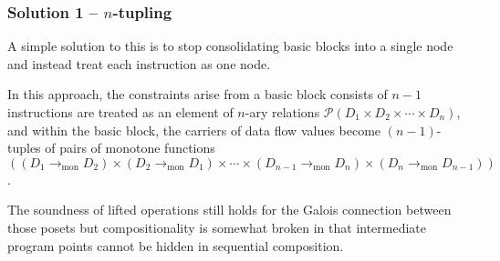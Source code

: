 \documentclass{beamer}
\newcommand{\Pow}{\mathcal{P}}
\newcommand{\tomon}{\to_{\mathrm{mon}}}
\begin{document}
\begin{frame}
  \frametitle{Solution 1 -- $n$-tupling}
  A simple solution to this is to stop consolidating basic blocks into a single node and instead treat each instruction as one node.

  In this approach, the constraints arise from a basic block consists of $n-1$ instructions are treated as an element of $n$-ary relations $\Pow(D_{1} \times D_{2} \times  \cdots  \times D_{n})$, and within the basic block, the carriers of data flow values become $(n-1)$-tuples of pairs of monotone functions $((D_{1} \tomon D_{2}) \times (D_{2} \tomon D_{1}) \times \cdots \times (D_{n-1} \tomon D_{n}) \times (D_{n} \tomon D_{n-1}))$.

  The soundness of lifted operations still holds for the Galois connection between those posets but compositionality is somewhat broken in that intermediate program points cannot be hidden in sequential composition.
\end{frame}
\end{document}
